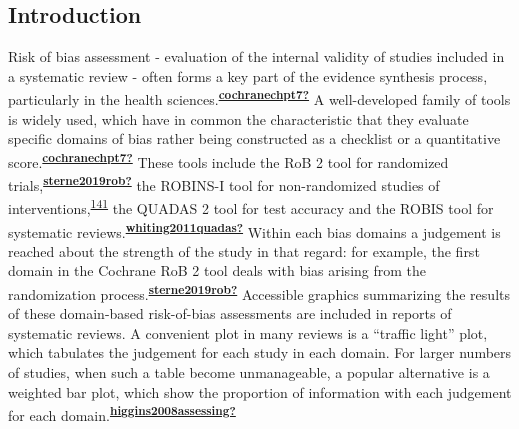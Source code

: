 \documentclass[a4paper, twoside]{templates/ociamthesis}
\begin{document}
\hypertarget{introduction-4}{%
\subsection{Introduction}\label{introduction-4}}

Risk of bias assessment - evaluation of the internal validity of studies included in a systematic review - often forms a key part of the evidence synthesis process, particularly in the health sciences.\textsuperscript{\protect\hyperlink{ref-cochranechpt7}{\textbf{cochranechpt7?}}} A well-developed family of tools is widely used, which have in common the characteristic that they evaluate specific domains of bias rather being constructed as a checklist or a quantitative score.\textsuperscript{\protect\hyperlink{ref-cochranechpt7}{\textbf{cochranechpt7?}}} These tools include the RoB 2 tool for randomized trials,\textsuperscript{\protect\hyperlink{ref-sterne2019rob}{\textbf{sterne2019rob?}}} the ROBINS-I tool for non-randomized studies of interventions,\textsuperscript{\protect\hyperlink{ref-sterne2016}{141}} the QUADAS 2 tool for test accuracy and the ROBIS tool for systematic reviews.\textsuperscript{\protect\hyperlink{ref-whiting2011quadas}{\textbf{whiting2011quadas?}}} Within each bias domains a judgement is reached about the strength of the study in that regard: for example, the first domain in the Cochrane RoB 2 tool deals with bias arising from the randomization process.\textsuperscript{\protect\hyperlink{ref-sterne2019rob}{\textbf{sterne2019rob?}}} Accessible graphics summarizing the results of these domain-based risk-of-bias assessments are included in reports of systematic reviews. A convenient plot in many reviews is a ``traffic light'' plot, which tabulates the judgement for each study in each domain. For larger numbers of studies, when such a table become unmanageable, a popular alternative is a weighted bar plot, which show the proportion of information with each judgement for each domain.\textsuperscript{\protect\hyperlink{ref-higgins2008assessing}{\textbf{higgins2008assessing?}}}
\end{document}
